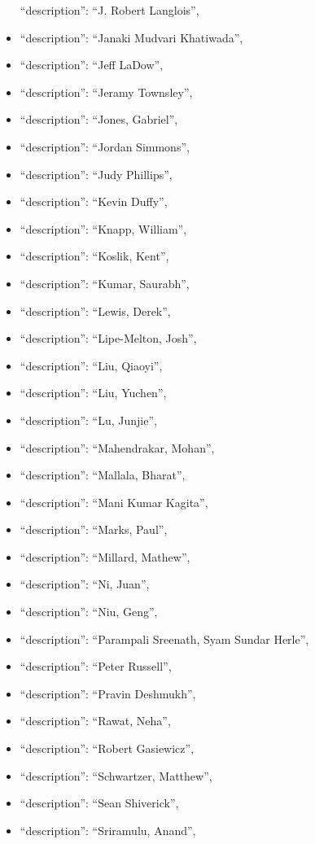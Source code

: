 \begin{itemize}
  ``description'': ``J. Robert Langlois'',
\item
  ``description'': ``Janaki Mudvari Khatiwada'',
\item
  ``description'': ``Jeff LaDow'',
\item
  ``description'': ``Jeramy Townsley'',
\item
  ``description'': ``Jones, Gabriel'',
\item
  ``description'': ``Jordan Simmons'',
\item
  ``description'': ``Judy Phillips'',
\item
  ``description'': ``Kevin Duffy'',
\item
  ``description'': ``Knapp, William'',
\item
  ``description'': ``Koslik, Kent'',
\item
  ``description'': ``Kumar, Saurabh'',
\item
  ``description'': ``Lewis, Derek'',
\item
  ``description'': ``Lipe-Melton, Josh'',
\item
  ``description'': ``Liu, Qiaoyi'',
\item
  ``description'': ``Liu, Yuchen'',
\item
  ``description'': ``Lu, Junjie'',
\item
  ``description'': ``Mahendrakar, Mohan'',
\item
  ``description'': ``Mallala, Bharat'',
\item
  ``description'': ``Mani Kumar Kagita'',
\item
  ``description'': ``Marks, Paul'',
\item
  ``description'': ``Millard, Mathew'',
\item
  ``description'': ``Ni, Juan'',
\item
  ``description'': ``Niu, Geng'',
\item
  ``description'': ``Parampali Sreenath, Syam Sundar Herle'',
\item
  ``description'': ``Peter Russell'',
\item
  ``description'': ``Pravin Deshmukh'',
\item
  ``description'': ``Rawat, Neha'',
\item
  ``description'': ``Robert Gasiewicz'',
\item
  ``description'': ``Schwartzer, Matthew'',
\item
  ``description'': ``Sean Shiverick'',
\item
  ``description'': ``Sriramulu, Anand'',

\end{itemize}
